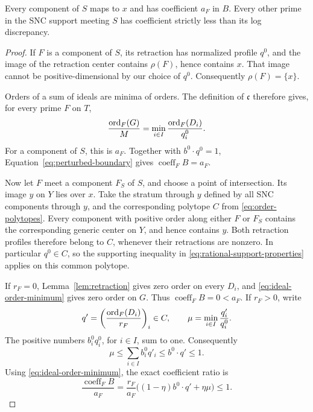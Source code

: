 \begin{lemma}
\label{lem:isolated-equality}
Every component of \(S\) maps to \(x\) and has coefficient \(a_F\)
in \(B\).  Every other prime in the SNC support meeting \(S\) has
coefficient strictly less than its log discrepancy.
\end{lemma}

\begin{proof}
If \(F\) is a component of \(S\), its retraction has normalized
profile \(q^0\), and the image of the retraction center contains
\(\rho(F)\), hence contains \(x\).  That image cannot be
positive-dimensional by our choice of \(q^0\).  Consequently
\(\rho(F)=\{x\}\).

Orders of a sum of ideals are minima of orders.  The definition of
\(\mathfrak c\) therefore gives, for every prime \(F\) on \(T\),
\begin{equation}
 \frac{\operatorname{ord}_F(G)}{M}
   =\min_{i\in I}\frac{\operatorname{ord}_F(D_i)}{q_i^0}.
 \label{eq:ideal-order-minimum}
\end{equation}
For a component of \(S\), this is \(a_F\).  Together with
\(b^0\cdot q^0=1\), Equation~\eqref{eq:perturbed-boundary} gives
\(\operatorname{coeff}_F B=a_F\).

Now let \(F\) meet a component \(F_S\) of \(S\), and choose a point
of intersection.  Its image \(y\) on \(Y\) lies over \(x\).
Take the stratum through \(y\) defined by all SNC components through
\(y\), and the corresponding polytope \(C\) from
\eqref{eq:order-polytopes}.  Every component with positive order
along either \(F\) or \(F_S\) contains the corresponding generic
center on \(Y\), and hence contains \(y\).  Both retraction profiles
therefore belong to \(C\), whenever their retractions are nonzero.
In particular \(q^0\in C\), so the supporting inequality in
\eqref{eq:rational-support-properties} applies on this common
polytope.

If \(r_F=0\), Lemma~\ref{lem:retraction} gives zero order on every
\(D_i\), and \eqref{eq:ideal-order-minimum} gives zero order on
\(G\).  Thus \(\operatorname{coeff}_F B=0<a_F\).  If \(r_F>0\),
write
\[
 q'=\left(\frac{\operatorname{ord}_F(D_i)}{r_F}\right)_i\in C,
 \qquad \mu=\min_{i\in I}\frac{q'_i}{q_i^0}.
\]
The positive numbers \(b_i^0q_i^0\), for \(i\in I\), sum to one.
Consequently
\begin{equation}
 \mu\leq\sum_{i\in I}b_i^0q'_i
       \leq b^0\cdot q'\leq1.
 \label{eq:rigid-minimum-inequality}
\end{equation}
Using \eqref{eq:ideal-order-minimum}, the exact coefficient ratio is
\begin{equation}
 \frac{\operatorname{coeff}_F B}{a_F}
   =\frac{r_F}{a_F}
       \bigl((1-\eta)b^0\cdot q'+\eta\mu\bigr)
   \leq1.
 \label{eq:boundary-discrepancy-ratio}
\end{equation}


\end{proof}
